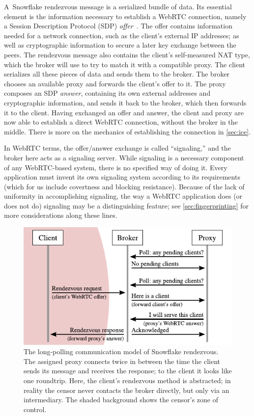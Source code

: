 \documentclass[letterpaper,twocolumn]{article}
\begin{document}
A~Snowflake rendezvous message is a serialized bundle of data.
Its essential element
is the information necessary to establish a WebRTC connection,
namely a Session Description Protocol (SDP) \emph{offer}~\cite[\S 5]{rfc8839}.
The offer contains information needed for a network connection,
such as the client's external IP addresses;
as well as cryptographic information to secure a later key exchange between the peers.
The rendezvous message also contains the client's
self-measured NAT type, which the broker will use to try to match it
with a compatible proxy.
The client serializes all these pieces of data and sends them to the broker.
The broker chooses an available proxy
and forwards the client's offer to it.
The proxy composes an SDP \emph{answer},
containing its own external addresses and cryptographic information,
and sends it back to the broker,
which then forwards it to the client.
Having exchanged an offer and answer,
the client and proxy are now able to establish a direct WebRTC connection,
without the broker in the middle.
There is more on the mechanics of establishing the connection
in \autoref{sec:ice}.

In WebRTC terms, the offer/answer exchange is called
``signaling,'' and the broker here acts as a signaling server.
While signaling is a necessary component
of any WebRTC-based system,
there is no specified way of doing it.
Every application must invent its own signaling system
according to its requirements
(which for us include covertness and blocking resistance).
Because of the lack of uniformity in accomplishing signaling,
the way a WebRTC application does (or does not do) signaling
may be a distinguishing feature; see \autoref{sec:fingerprinting}
for more considerations along these lines.

\begin{figure}
\includegraphics{figures/rendezvous/rendezvous}
\caption{
The long-polling communication model of Snowflake rendezvous.
The assigned proxy connects twice in between the time
the client sends its message and receives the response;
to the client it looks like one roundtrip.
Here, the client's rendezvous method is abstracted;
in reality the censor never contacts the broker directly,
but only via an intermediary.
The shaded background shows the censor's zone of control.
}
\label{fig:rendezvous}
\end{figure}
\end{document}

